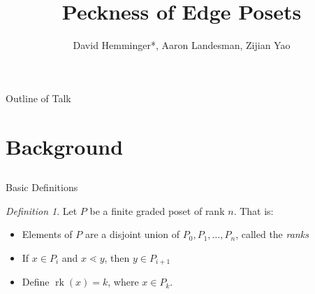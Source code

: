 \documentclass{beamer}
\title{Peckness of Edge Posets}
\author{David Hemminger*\inst{1}, Aaron Landesman\inst{2}, Zijian Yao\inst{3}}
\institute[VFU] %
{
  \inst{1}
  Duke University
,
  \inst{2}
  Harvard University
  ,
  \inst{3}
  Brown University
}
\theoremstyle{remark}
\newtheorem{defn}[thm]{Definition}
\newcommand\rk{\operatorname{rk}}
\begin{document}
\begin{frame}
	\titlepage
\end{frame}


\begin{frame}{Outline of Talk}
	\tableofcontents
\end{frame}







\section{Background}
\subsection{}




\begin{frame}{Basic Definitions}

\begin{defn}
Let $P$ be a finite graded poset of rank $n$. That is:
\begin{itemize}
\item Elements of $P$ are a disjoint union of $P_0,P_1,\ldots,P_n$, called the \textit{ranks}
\item If $x\in P_i$ and $x\lessdot y$, then $y\in P_{i+1}$
\item Define $\rk(x) = k$, where $x\in P_k$.
\end{itemize}
\end{defn}

\end{frame}
\end{document}

